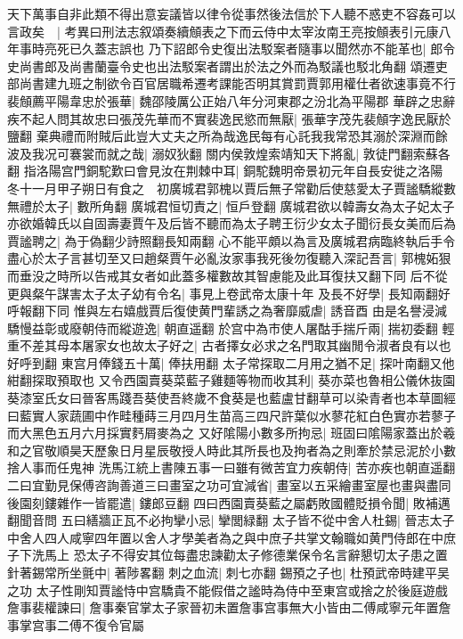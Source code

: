 天下萬事自非此類不得出意妄議皆以律令從事然後法信於下人聽不惑吏不容姦可以言政矣　|{
	考異曰刑法志叙頌奏續頠表之下而云侍中太宰汝南王亮按頠表引元康八年事時亮死已久蓋志誤也}
乃下詔郎令史復出法駁案者隨事以聞然亦不能革也|{
	郎令史尚書郎及尚書蘭臺令史也出法駁案者謂出於法之外而為駁議也駁北角翻}
頌遷吏部尚書建九班之制欲令百官居職希遷考課能否明其賞罰賈郭用權仕者欲速事竟不行裴頠薦平陽韋忠於張華|{
	魏邵陵厲公正始八年分河東郡之汾北為平陽郡}
華辟之忠辭疾不起人問其故忠曰張茂先華而不實裴逸民慾而無厭|{
	張華字茂先裴頠字逸民厭於鹽翻}
棄典禮而附賊后此豈大丈夫之所為哉逸民每有心託我我常恐其溺於深淵而餘波及我况可褰裳而就之哉|{
	溺奴狄翻}
關内侯敦煌索靖知天下將亂|{
	敦徒門翻索蘇各翻}
指洛陽宫門銅駝歎曰會見汝在荆棘中耳|{
	銅駝魏明帝景初元年自長安徙之洛陽}
冬十一月甲子朔日有食之　初廣城君郭槐以賈后無子常勸后使慈愛太子賈謐驕縱數無禮於太子|{
	數所角翻}
廣城君恒切責之|{
	恒戶登翻}
廣城君欲以韓壽女為太子妃太子亦欲婚韓氏以自固壽妻賈午及后皆不聽而為太子聘王衍少女太子聞衍長女美而后為賈謐聘之|{
	為于偽翻少詩照翻長知兩翻}
心不能平頗以為言及廣城君病臨終執后手令盡心於太子言甚切至又曰趙粲賈午必亂汝家事我死後勿復聽入深記吾言|{
	郭槐妬狠而垂没之時所以告戒其女者如此蓋多權數故其智慮能及此耳復扶又翻下同}
后不從更與粲午謀害太子太子幼有令名|{
	事見上卷武帝太康十年}
及長不好學|{
	長知兩翻好呼報翻下同}
惟與左右嬉戲賈后復使黄門輩誘之為奢靡威虐|{
	誘音酉}
由是名譽浸減驕慢益彰或廢朝侍而縱遊逸|{
	朝直遥翻}
於宫中為市使人屠酤手揣斤兩|{
	揣初委翻}
輕重不差其母本屠家女也故太子好之|{
	古者擇女必求之名門取其幽閒令淑者良有以也好呼到翻}
東宫月俸錢五十萬|{
	俸扶用翻}
太子常探取二月用之猶不足|{
	探叶南翻又他紺翻探取預取也}
又令西園賣葵菜藍子雞麵等物而收其利|{
	葵亦菜也魯相公儀休抜園葵漆室氏女曰晉客馬踐吾葵使吾終歲不食葵是也藍盧甘翻草可以染青者也本草圖經曰藍實人家蔬圃中作畦種蒔三月四月生苗高三四尺許葉似水蓼花紅白色實亦若蓼子而大黑色五月六月採實麫屑麥為之}
又好隂陽小數多所拘忌|{
	班固曰隂陽家蓋出於羲和之官敬順昊天歷象日月星辰敬授人時此其所長也及拘者為之則牽於禁忌泥於小數捨人事而任鬼神}
洗馬江統上書陳五事一曰雖有微苦宜力疾朝侍|{
	苦亦疾也朝直遥翻}
二曰宜勤見保傅咨詢善道三曰畫室之功可宜減省|{
	畫室以五采繪畫室屋也畫與盡同}
後園刻鏤雜作一皆罷遣|{
	鏤郎豆翻}
四曰西園賣葵藍之屬虧敗國體貶損令聞|{
	敗補邁翻聞音問}
五曰繕牆正瓦不必拘攣小忌|{
	攣閭緑翻}
太子皆不從中舍人杜錫|{
	晉志太子中舍人四人咸寧四年置以舍人才學美者為之與中庶子共掌文翰職如黄門侍郎在中庶子下洗馬上}
恐太子不得安其位每盡忠諫勸太子修德業保令名言辭懇切太子患之置針著錫常所坐氈中|{
	著陟畧翻}
刺之血流|{
	刺七亦翻}
錫預之子也|{
	杜預武帝時建平吴之功}
太子性剛知賈謐恃中宫驕貴不能假借之謐時為侍中至東宫或捨之於後庭遊戲詹事裴權諫曰|{
	詹事秦官掌太子家晉初未置詹事宫事無大小皆由二傅咸寧元年置詹事掌宫事二傅不復令官屬}
